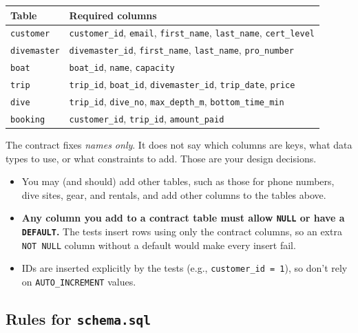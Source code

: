 \documentclass[11pt]{article}
\newcommand{\code}[1]{\texttt{#1}}
\begin{document}
\begin{center}
\renewcommand{\arraystretch}{1.15}
\begin{tabularx}{\linewidth}{@{}l>{\raggedright\arraybackslash}X@{}}
\toprule
\textbf{Table} & \textbf{Required columns} \\
\midrule
\code{customer}   & \code{customer\_id}, \code{email}, \code{first\_name}, \code{last\_name}, \code{cert\_level} \\
\code{divemaster} & \code{divemaster\_id}, \code{first\_name}, \code{last\_name}, \code{pro\_number} \\
\code{boat}       & \code{boat\_id}, \code{name}, \code{capacity} \\
\code{trip}       & \code{trip\_id}, \code{boat\_id}, \code{divemaster\_id}, \code{trip\_date}, \code{price} \\
\code{dive}       & \code{trip\_id}, \code{dive\_no}, \code{max\_depth\_m}, \code{bottom\_time\_min} \\
\code{booking}    & \code{customer\_id}, \code{trip\_id}, \code{amount\_paid} \\
\bottomrule
\end{tabularx}
\end{center}

The contract fixes \emph{names only}. It does not say which columns are keys, what data types to use,
or what constraints to add. Those are your design decisions.

\begin{itemize}
  \item You may (and should) add other tables, such as those for phone numbers, dive sites, gear,
    and rentals, and add other columns to the tables above.
  \item \textbf{Any column you add to a contract table must allow \code{NULL} or have a \code{DEFAULT}.}
    The tests insert rows using only the contract columns, so an extra \code{NOT NULL} column
    without a default would make every insert fail.
  \item IDs are inserted explicitly by the tests (e.g., \code{customer\_id = 1}), so don't rely on
    \code{AUTO\_INCREMENT} values.
\end{itemize}

\newpage
\subsection*{Rules for \code{schema.sql}}
\end{document}
